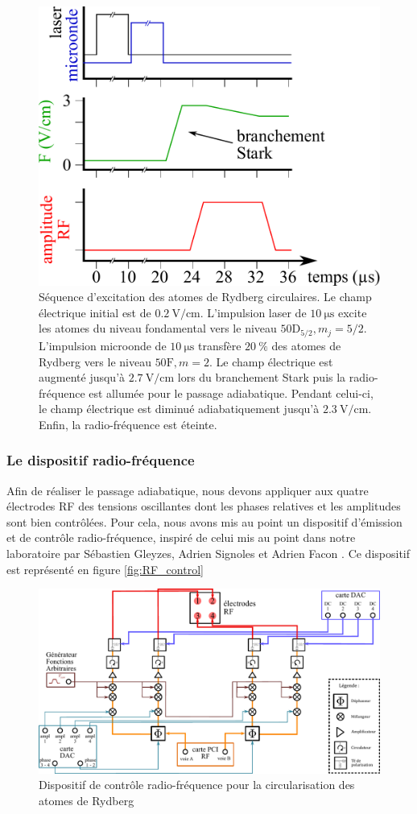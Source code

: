 \begin{figure}
\centering
\includegraphics[width=.6\linewidth]{figures/circulars/seq_circul}
\caption[Séquence d'excitation des atomes de Rydberg circulaires]{
Séquence d'excitation des atomes de Rydberg circulaires.
Le champ électrique initial est de $\SI{0.2}{\V/\cm}$.
L'impulsion laser de $\SI{10}{\us}$ excite les atomes du niveau fondamental vers le niveau $\mathrm{50D}_{5/2},m_j=5/2$.
L'impulsion microonde de $\SI{10}{\us}$ transfère $\SI{20}{\percent}$ des atomes de Rydberg vers le niveau $\mathrm{50F},m=2$.
Le champ électrique est augmenté jusqu'à $\SI{2.7}{\V/\cm}$ lors du \og branchement Stark \fg{} puis la radio-fréquence est allumée pour le passage adiabatique.
Pendant celui-ci, le champ électrique est diminué adiabatiquement jusqu'à $\SI{2.3}{\V/\cm}$.
Enfin, la radio-fréquence est éteinte.
}
\label{fig:seq_circul}
\end{figure}

\subsubsection*{Le dispositif radio-fréquence}
\noindent Afin de réaliser le passage adiabatique, nous devons appliquer aux quatre électrodes RF des tensions oscillantes dont les phases relatives et les amplitudes sont bien contrôlées.
Pour cela, nous avons mis au point un dispositif d'émission et de contrôle radio-fréquence, inspiré de celui mis au point dans notre laboratoire par Sébastien Gleyzes, Adrien Signoles et Adrien Facon \cite{PHD_SIGNOLES,PHD_FACON}.
Ce dispositif est représenté en figure \eqref{fig:RF_control}

\begin{figure}
\centering
\includegraphics[width=.9\linewidth]{figures/circulars/RF_control}
\caption[Dispositif de contrôle radio-fréquence]
{Dispositif de contrôle radio-fréquence pour la circularisation des atomes de Rydberg}
\label{fig:RF_control}
\end{figure}

